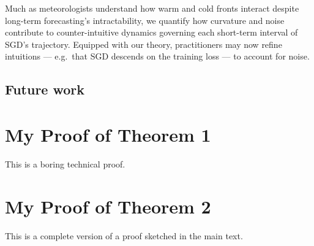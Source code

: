 \documentclass[final,12pt]{colt2021} %
\begin{document}
            Much as meteorologists understand how warm and cold fronts interact
            despite long-term forecasting's intractability, we quantify how
            curvature and noise contribute to counter-intuitive dynamics governing
            each short-term interval of SGD's trajectory.  Equipped with our
            theory, practitioners may now refine intuitions --- e.g.\ that SGD
            descends on the training loss --- to account for noise.
    
    
        \subsection{Future work}
    
    
    
    
    \appendix
    
        \section{My Proof of Theorem 1}
        
            This is a boring technical proof.
        
        \section{My Proof of Theorem 2}
        
            This is a complete version of a proof sketched in the main text.
    
\end{document}
